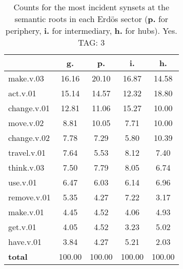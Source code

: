 \begin{table}[h!]
\begin{center}
\begin{tabular}{| l || c | c | c | c |}\hline
 & {\bf g.} & {\bf p.} & {\bf i.} & {\bf h.} \\\hline\hline
make.v.03 & 16.16  & 20.10  & 16.87  & 14.58 \\\hline
act.v.01 & 15.14  & 14.57  & 12.32  & 18.80 \\\hline
change.v.01 & 12.81  & 11.06  & 15.27  & 10.00 \\\hline
move.v.02 & 8.81  & 10.05  & 7.71  & 10.00 \\\hline
change.v.02 & 7.78  & 7.29  & 5.80  & 10.39 \\\hline
travel.v.01 & 7.64  & 5.53  & 8.12  & 7.40 \\\hline
think.v.03 & 7.50  & 7.79  & 8.05  & 6.74 \\\hline
use.v.01 & 6.47  & 6.03  & 6.14  & 6.96 \\\hline
remove.v.01 & 5.35  & 4.27  & 7.22  & 3.17 \\\hline
make.v.01 & 4.45  & 4.52  & 4.06  & 4.93 \\\hline
get.v.01 & 4.05  & 4.52  & 3.23  & 5.02 \\\hline
have.v.01 & 3.84  & 4.27  & 5.21  & 2.03 \\\hline\hline
{{\bf total}} & 100.00  & 100.00  & 100.00  & 100.00 \\\hline
\end{tabular}
\caption{Counts for the most incident synsets at the semantic roots in each Erd\"os sector ({\bf p.} for periphery, {\bf i.} for intermediary, {\bf h.} for hubs). Yes. TAG: 3}
\end{center}
\end{table}